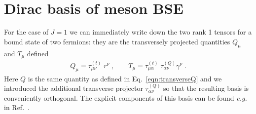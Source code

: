 \chapter{Dirac basis of meson BSE}
\label{app:basis}

For the case of $J=1$ we can immediately write down the two rank 1 tensors for a bound state of two
fermions: they are the transversely projected quantities $Q_\mu$ and $T_\mu$ defined 
%
\begin{align}\label{eqn:transverseprojectors}
Q_{\mu} = \tau^{(t)}_{\mu\nu}\; r^\nu\;,\qquad
T_{\mu} = \tau^{(t)}_{\mu\alpha}\; \tau^{(Q)}_{\alpha\nu}\gamma^\nu\;.
\end{align}
%
Here $Q$ is the same quantity as defined in Eq.~\eqref{eqn:transverseQ} and we introduced the 
additional transverse projector $\tau^{(Q)}_{\alpha\nu}$ so that the resulting basis is 
conveniently orthogonal. The explicit components of this basis can be found {\it e.g.} in 
Ref.~\cite{Maris:1999nt}.


